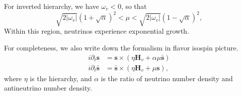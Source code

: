 For inverted hierarchy, we have $\omega_v < 0$, so that
\begin{equation*}
   \sqrt{ 2\lvert\omega_v\rvert }{ (1+\sqrt{\alpha})^2 } < \mu < \sqrt{ 2\lvert\omega_v\rvert }{ (1-\sqrt{\alpha})^2 },
\end{equation*}
Within this region, neutrinos experience exponential growth.

For completeness, we also write down the formalism in flavor isospin picture.
\begin{align}
    i\partial_t \mathbf s &= \mathbf s \times ( \eta \mathbf H_v + \alpha \mu \bar{\mathbf s} )\\
    i\partial_t \bar{\mathbf s} &= \bar{\mathbf s} \times ( \eta \mathbf H_v + \mu \mathbf s ),
    \label{chap:app-sec:bipolar-eqn:flavor-isospin-eom}
\end{align}
where $\eta$ is the hierarchy, and $\alpha$ is the ratio of neutrino number density and antineutrino number density.


